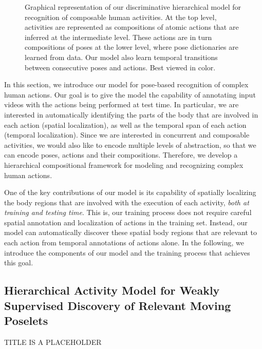 \begin{figure}[tb]
\begin{center}
\fbox{\rule{0pt}{2in} \rule{0.9\linewidth}{0pt}}
\end{center}
   \caption{Graphical representation of our discriminative hierarchical model for recognition of composable human activities.
At the top level, activities are represented as compositions of atomic actions that are inferred at
the intermediate level. These actions are in turn compositions of poses at the
lower level, where pose dictionaries are learned from data. Our model also learn
temporal transitions between consecutive poses and actions. Best viewed in
color.}
\label{fig:overview}

\end{figure}


In this section, we introduce our model for pose-based recognition of complex
human actions. Our goal is to give the model the capability of annotating input
videos with the actions being performed at test time. In particular, we are
interested in automatically identifying the parts of the body that are involved
in each action (spatial localization), as well as the temporal span of each
action (temporal localization). Since we are interested in concurrent and
composable activities, we would also like to encode multiple levels of
abstraction, so that we can encode poses, actions and their compositions.
Therefore, we develop a hierarchical compositional framework for modeling and
recognizing complex human actions.

One of the key contributions of our model is its capability of spatially
localizing the body regions that are involved with the execution of each
activity, \emph{both at training and testing time}. This is, our training
process does not require careful spatial annotation and localization of
actions in the training set. Instead, our model can automatically
discover these spatial body regions that are relevant to each action
from temporal annotations of actions alone. In the following, we introduce
the components of our model and the training process that achieves this goal.

\subsection{Hierarchical Activity Model for Weakly Supervised Discovery of
Relevant Moving Poselets}
TITLE IS A PLACEHOLDER

